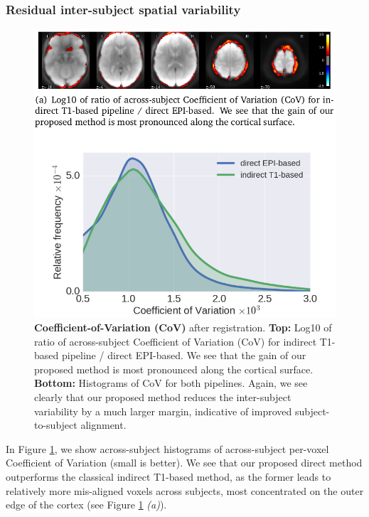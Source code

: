 \subsubsection{Residual inter-subject spatial variability}
\begin{figure}[!htb]
\includegraphics[width=1\linewidth]{figures/cov.png}
 
             
\caption{\textbf{Coefficient-of-Variation (CoV)} after registration. \textbf{Top:} Log10 of ratio of across-subject Coefficient of Variation (CoV) for indirect T1-based pipeline / direct EPI-based. We see that the gain of our proposed method is most pronounced along the cortical surface.
\textbf{Bottom:} Histograms of CoV  for both
  pipelines. Again, we see clearly that our proposed method reduces the inter-subject variability by a much larger margin, indicative of improved subject-to-subject alignment.}
\label{fig:cv}
\end{figure}

In Figure \ref{fig:cv}, we show across-subject histograms of
across-subject per-voxel Coefficient of Variation (small is better).
We see that our proposed direct method outperforms the classical indirect T1-based method, as the former leads to relatively more mis-aligned voxels across subjects, most concentrated on the outer edge of the cortex (see Figure \ref{fig:cv} \textit{(a)}).


